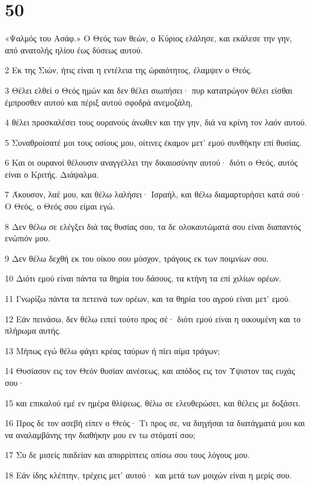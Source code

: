 \chapter{50}

\par «Ψαλμός του Ασάφ.» Ο Θεός των θεών, ο Κύριος ελάλησε, και εκάλεσε την γην, από ανατολής ηλίου έως δύσεως αυτού.
\par 2 Εκ της Σιών, ήτις είναι η εντέλεια της ώραιότητος, έλαμψεν ο Θεός.
\par 3 Θέλει ελθεί ο Θεός ημών και δεν θέλει σιωπήσει· πυρ κατατρώγον θέλει είσθαι έμπροσθεν αυτού και πέριξ αυτού σφοδρά ανεμοζάλη,
\par 4 θέλει προσκαλέσει τους ουρανούς άνωθεν και την γην, διά να κρίνη τον λαόν αυτού.
\par 5 Συναθροίσατέ μοι τους οσίους μου, οίτινες έκαμον μετ' εμού συνθήκην επί θυσίας.
\par 6 Και οι ουρανοί θέλουσιν αναγγέλλει την δικαιοσύνην αυτού· διότι ο Θεός, αυτός είναι ο Κριτής. Διάψαλμα.
\par 7 Άκουσον, λαέ μου, και θέλω λαλήσει· Ισραήλ, και θέλω διαμαρτυρήσει κατά σού· Ο Θεός, ο Θεός σου είμαι εγώ.
\par 8 Δεν θέλω σε ελέγξει διά τας θυσίας σου, τα δε ολοκαυτώματά σου είναι διαπαντός ενώπιόν μου.
\par 9 Δεν θέλω δεχθή εκ του οίκου σου μόσχον, τράγους εκ των ποιμνίων σου.
\par 10 Διότι εμού είναι πάντα τα θηρία του δάσους, τα κτήνη τα επί χιλίων ορέων.
\par 11 Γνωρίζω πάντα τα πετεινά των ορέων, και τα θηρία του αγρού είναι μετ' εμού.
\par 12 Εάν πεινάσω, δεν θέλω ειπεί τούτο προς σέ· διότι εμού είναι η οικουμένη και το πλήρωμα αυτής.
\par 13 Μήπως εγώ θέλω φάγει κρέας ταύρων ή πίει αίμα τράγων;
\par 14 Θυσίασον εις τον Θεόν θυσίαν αινέσεως, και απόδος εις τον Ύψιστον τας ευχάς σου·
\par 15 και επικαλού εμέ εν ημέρα θλίψεως, θέλω σε ελευθερώσει, και θέλεις με δοξάσει.
\par 16 Προς δε τον ασεβή είπεν ο Θεός· Τι προς σε, να διηγήσαι τα διατάγματά μου και να αναλαμβάνης την διαθήκην μου εν τω στόματί σου;
\par 17 Συ δε μισείς παιδείαν και απορρίπτεις οπίσω σου τους λόγους μου.
\par 18 Εάν ίδης κλέπτην, τρέχεις μετ' αυτού· και μετά των μοιχών είναι η μερίς σου.
